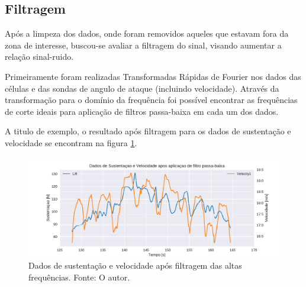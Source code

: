 \subsection{Filtragem}

Após a limpeza dos dados, onde foram removidos aqueles que estavam fora da zona de interesse, buscou-se avaliar a filtragem do sinal, visando aumentar a relação sinal-ruido.

Primeiramente foram realizadas Transformadas Rápidas de Fourier nos dados das células e das sondas de angulo de ataque (incluindo velocidade). Através da transformação para o domínio da frequência foi possível encontrar as frequências de corte ideais para aplicação de filtros passa-baixa em cada um dos dados.





A titulo de exemplo, o resultado após filtragem para os dados de sustentação e velocidade se encontram na figura \ref{fig:filtered_lift_plot}.

\begin{figure}[!ht]
    \centering
    \includegraphics[width=.8\linewidth]{plots/filtered_lift_plot.pdf}
    \caption{Dados de sustentação e velocidade após filtragem das altas frequências. Fonte: O autor.}
    \label{fig:filtered_lift_plot}
\end{figure}

